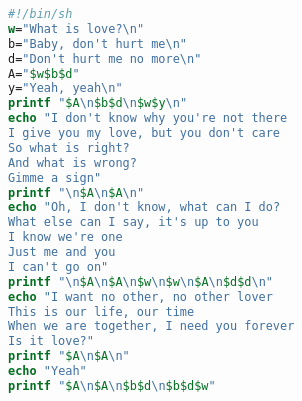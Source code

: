 \headerfooteroff{}
\pagecolor{black!5}\afterpage{\nopagecolor}
\vspace*{\fill}
\begin{lstlisting}[language=csh]
#!/bin/sh
w="What is love?\n"
b="Baby, don't hurt me\n"
d="Don't hurt me no more\n"
A="$w$b$d"
y="Yeah, yeah\n"
printf "$A\n$b$d\n$w$y\n"
echo "I don't know why you're not there
I give you my love, but you don't care
So what is right?
And what is wrong?
Gimme a sign"
printf "\n$A\n$A\n"
echo "Oh, I don't know, what can I do?
What else can I say, it's up to you
I know we're one
Just me and you
I can't go on"
printf "\n$A\n$A\n$w\n$w\n$A\n$d$d\n"
echo "I want no other, no other lover
This is our life, our time
When we are together, I need you forever
Is it love?"
printf "$A\n$A\n"
echo "Yeah"
printf "$A\n$A\n$b$d\n$b$d$w"
\end{lstlisting}
\vspace*{\fill}
\clearpage
\headerfooteron{}

